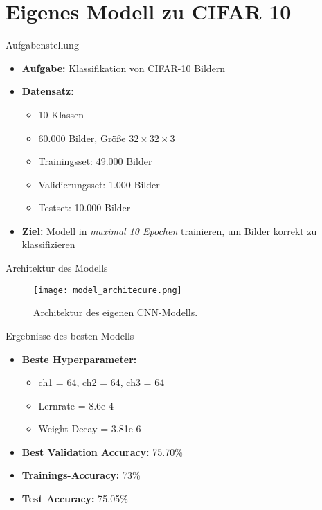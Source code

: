 \section{Eigenes Modell zu CIFAR 10}


\begin{frame}{Aufgabenstellung}
    \begin{itemize}
        \item \textbf{Aufgabe:} Klassifikation von CIFAR-10 Bildern
        \item \textbf{Datensatz:}
            \begin{itemize}
                \item 10 Klassen
                \item 60.000 Bilder, Größe $32\times32\times3$
                \item Trainingsset: 49.000 Bilder
                \item Validierungsset: 1.000 Bilder
                \item Testset: 10.000 Bilder
            \end{itemize}
        \item \textbf{Ziel:} Modell in \emph{maximal 10 Epochen} trainieren, um Bilder korrekt zu klassifizieren
    \end{itemize}
\end{frame}


\begin{frame}{Architektur des Modells}
    \begin{figure}
        \centering
        \texttt{[image: model\_architecure.png]}
        \caption{Architektur des eigenen CNN-Modells.}
    \end{figure}
\end{frame}


\begin{frame}{Ergebnisse des besten Modells}
\begin{itemize}
    \item \textbf{Beste Hyperparameter:}
        \begin{itemize}
            \item ch1 = 64, ch2 = 64, ch3 = 64
            \item Lernrate = 8.6e-4
            \item Weight Decay = 3.81e-6
        \end{itemize}
    \item \textbf{Best Validation Accuracy:} \alert{75.70\%}
    \item \textbf{Trainings-Accuracy:} \alert{73\%}
    \item \textbf{Test Accuracy:} \alert{75.05\%}
\end{itemize}
\end{frame}

